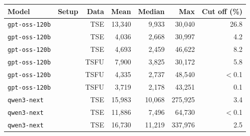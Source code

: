 \begin{tabular}{llr rrr r}
\toprule
\textbf{Model} & \textbf{Setup} & \textbf{Data} & \textbf{Mean} & \textbf{Median} & \textbf{Max} & \textbf{Cut off (\%)} \\
\midrule
\texttt{gpt-oss-120b} & \mdirect{} & \textsc{TSE} & 13,340 & 9,933 & 30,040 & 26.8 \\
\texttt{gpt-oss-120b} & \mcode{} & \textsc{TSE} & 4,036 & 2,668 & 30,997 & 4.2 \\
\texttt{gpt-oss-120b} & \mhybrid{} & \textsc{TSE} & 4,693 & 2,459 & 46,622 & 8.2 \\
\texttt{gpt-oss-120b} & \mdirect{} & \textsc{TSFU} & 7,900 & 3,825 & 30,172 & 5.8 \\
\texttt{gpt-oss-120b} & \mcode{} & \textsc{TSFU} & 4,335 & 2,737 & 48,540 & $<$0.1 \\
\texttt{gpt-oss-120b} & \mhybrid{} & \textsc{TSFU} & 3,719 & 2,178 & 43,251 & 0.1 \\
\midrule
\texttt{qwen3-next} & \mdirect{} & \textsc{TSE} & 15,983 & 10,068 & 275,925 & 3.4 \\
\texttt{qwen3-next} & \mcode{} & \textsc{TSE} & 11,886 & 7,496 & 64,730 & $<$0.1 \\
\texttt{qwen3-next} & \mhybrid{} & \textsc{TSE} & 16,730 & 11,219 & 337,976 & 2.5 \\
\bottomrule
\end{tabular}
